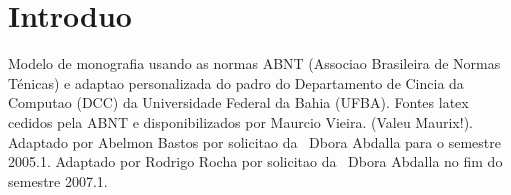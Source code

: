 \chapter{Introduo}

Modelo de monografia usando as normas ABNT (Associao Brasileira de Normas
Ténicas) 
e adaptao personalizada 
do padro do Departamento de Cincia da Computao (DCC) da Universidade
Federal da Bahia (UFBA).
Fontes latex cedidos pela ABNT e disponibilizados por 
Maurcio Vieira. (Valeu Maurix!). Adaptado por Abelmon Bastos por solicitao
da \profa\ Dbora Abdalla para o semestre 2005.1.
Adaptado por Rodrigo Rocha por solicitao da \profa\ Dbora Abdalla no fim
do semestre 2007.1.





